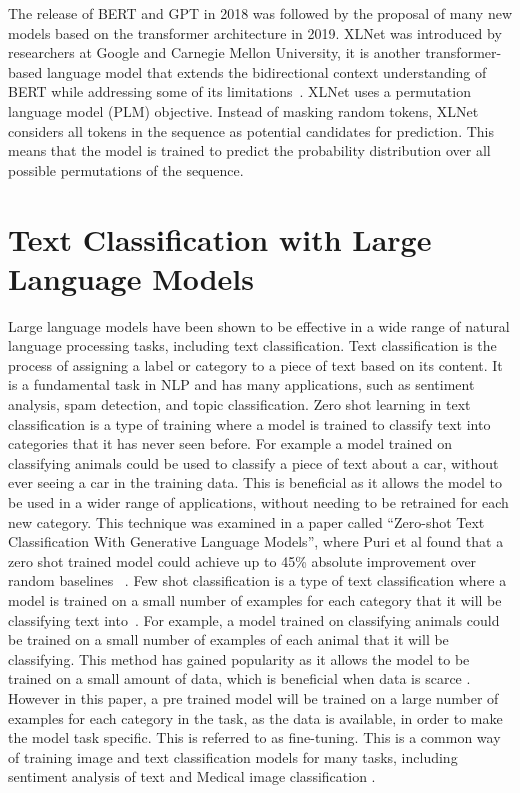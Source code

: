 \documentclass{UoYCSproject}
\begin{document}
    The release of BERT and GPT in 2018 was followed by the proposal of many new models based on the transformer architecture in 2019.
    XLNet was introduced by researchers at Google and Carnegie Mellon University, it is another transformer-based language model that extends the bidirectional context understanding of BERT while addressing some of its limitations~\cite{yang2020xlnet}.
    XLNet uses a permutation language model (PLM) objective.
    Instead of masking random tokens, XLNet considers all tokens in the sequence as potential candidates for prediction.
    This means that the model is trained to predict the probability distribution over all possible permutations of the sequence. \par

    \section{Text Classification with Large Language Models}
    \label{sec:text-classification}
    Large language models have been shown to be effective in a wide range of natural language processing tasks, including text classification.
    Text classification is the process of assigning a label or category to a piece of text based on its content.
    It is a fundamental task in NLP and has many applications, such as sentiment analysis, spam detection, and topic classification.
    Zero shot learning in text classification is a type of training where a model is trained to classify text into categories that it has never seen before\cite{zeroshot}.
    For example a model trained on classifying animals could be used to classify a piece of text about a car, without ever seeing a car in the training data.
    This is beneficial as it allows the model to be used in a wider range of applications, without needing to be retrained for each new category.
    This technique was examined in a paper called ``Zero-shot Text Classification With Generative Language Models'', where Puri et al found that a zero shot trained model could achieve up to 45\% absolute improvement over random baselines ~\cite{puri2019zeroshot}.
    Few shot classification is a type of text classification where a model is trained on a small number of examples for each category that it will be classifying text into~\cite{luo2023closer}.
    For example, a model trained on classifying animals could be trained on a small number of examples of each animal that it will be classifying.
This method has gained popularity as it allows the model to be trained on a small amount of data, which is beneficial when data is scarce \cite{luo2023closer}.
    However in this paper, a pre trained model will be trained on a large number of examples for each category in the task, as the data is available, in order to make the model task specific.
    This is referred to as fine-tuning.
    This is a common way of training image and text classification models for many tasks, including sentiment analysis of text and Medical image classification \cite{SentAnalysis, medFineTuning}. \par
\end{document}
